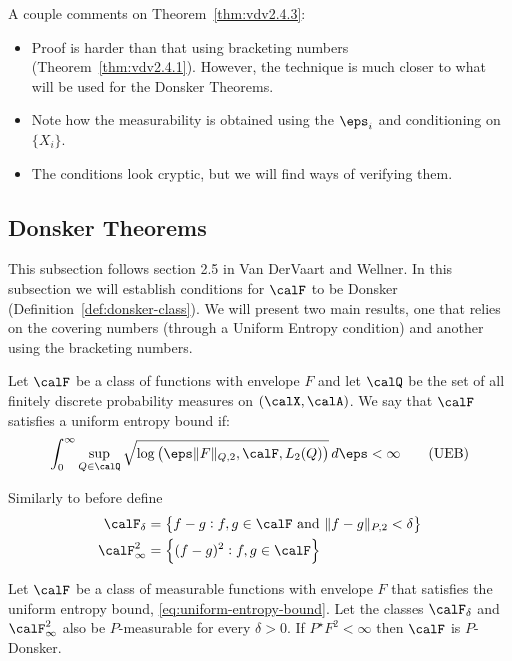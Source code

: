 \begin{remark*}
	A couple comments on Theorem~\ref{thm:vdv2.4.3}:
	\begin{itemize}
		\item Proof is harder than that using bracketing numbers (Theorem~\ref{thm:vdv2.4.1}). However, the technique is much closer to what will be used for the Donsker Theorems. 
		\item Note how the measurability is obtained using the \(\eps_i\) and conditioning on  \(\{X_i\}\).
		\item The conditions look cryptic, but we will find ways of verifying them.
	\end{itemize}
\end{remark*}

\subsection{Donsker Theorems}%
\label{subsec:Donsker}

This subsection follows section 2.5 in Van DerVaart and Wellner. In this subsection we will establish conditions for \(\calF\) to be Donsker (Definition~\ref{def:donsker-class}). We will present two main results, one that relies on the covering numbers (through a Uniform Entropy condition) and another using the bracketing numbers. 

\begin{definition}
	\label{def:uniform-entropy}
	Let \(\calF\) be a class of functions with envelope \(F\) and let \(\calQ\) be the set of all finitely discrete probability measures on  \((\calX,\calA)\). We say that \(\calF\) satisfies a uniform entropy bound if:
	\begin{equation}
		\label{eq:uniform-entropy-bound}
		\int_{0}^{\infty} \sup_{Q\in\calQ} \sqrt{\log\left(\eps\|F\|_{Q,2},\calF, L_2(Q)\right)}\,d\eps<\infty\tag{UEB}
	\end{equation}
\end{definition}
Similarly to before define
\begin{align}
	\calF_\delta &= \left\{f-g:f,g\in\calF\text{ and }\|f-g\|_{P,2}<\delta\right\} \\
	\calF_\infty^2 &= \left\{(f-g)^2: f,g\in\calF\right\}
\end{align}
\begin{theorem}
	\label{thm:vdv2.5.2}
	Let \(\calF\) be a class of measurable functions with envelope \(F\) that satisfies the uniform entropy bound, \eqref{eq:uniform-entropy-bound}. Let the classes \(\calF_\delta\) and  \(\calF_\infty^2\) also be  \(P\)-measurable for every  \(\delta >0\). If  \(P^\star F^2 <\infty\) then \(\calF\) is  \(P\)-Donsker.
\end{theorem}
